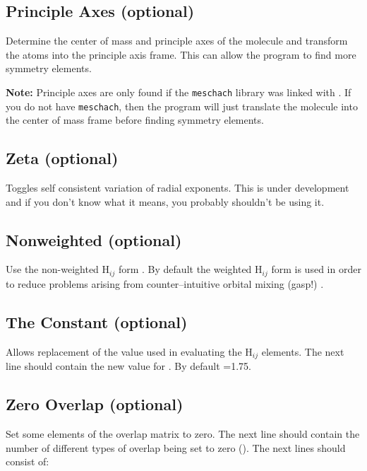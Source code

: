 \subsection{{\sf Principle Axes} (optional)}

Determine the center of mass and principle axes of the molecule and
transform the atoms into the principle axis frame.  This can allow the
program to find more symmetry elements.  

{\bf Note:} Principle axes are only found if the {\tt meschach} library
was linked with \calcprog.  If you do not have {\tt meschach}, then
the program will just translate the molecule into the center of mass
frame before finding symmetry elements.

\subsection{{\sf Zeta} (optional)}

Toggles self consistent variation of radial exponents.  This is under
development and if you don't know what it means, you probably
shouldn't be using it.

\subsection{{\sf Nonweighted} (optional)}

Use the non-weighted H$_{ij}$ form \cite{wolfsberg}. 
By default the weighted H$_{ij}$
form is used in order to reduce problems arising from
counter--intuitive orbital mixing (gasp!) \cite{com1,com2}.

\subsection{{\sf The Constant} (optional)}

Allows replacement of the value  used in evaluating the H$_{ij}$
elements.  The next line should contain the new value for .
By default =1.75.

\subsection{{\sf Zero Overlap} (optional)}

Set some elements of the overlap matrix to zero.  The next line should
contain the number of different types of overlap being set to zero
().  The next  lines should
consist of:

